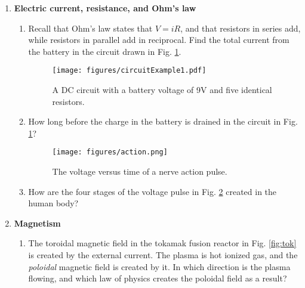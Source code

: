 \documentclass[10pt]{article}
\begin{document}
\begin{enumerate}
\begin{enumerate}
\item The capacitance of a parallel plate capacitor is $C = \epsilon_0 A/d$, where $A$ is the area of the plates, $d$ is the separation between the plates, and $\epsilon_0 = 8.85 \times 10^{-12}$ N$^{-1}$ C$^2$ m$^{-2}$.  What is the capacitance of a capacitor with an area of 4 mm$^2$ and a separation of 1 mm? \\ \vspace{2cm}
\item If two such capacitors are connected \textit{in parallel}, what is the total capacitance?  What is the total capacitance if they are connected \textit{in series}? \\ \vspace{2cm}
\end{enumerate}
\item \textbf{Electric current, resistance, and Ohm's law}
\begin{enumerate}
\item Recall that Ohm's law states that $V = iR$, and that resistors in series add, while resistors in parallel add in reciprocal.  Find the total current from the battery in the circuit drawn in Fig. \ref{fig:circuit}.
\begin{figure}[hb]
\centering
\texttt{[image: figures/circuitExample1.pdf]}
\caption{\label{fig:circuit} A DC circuit with a battery voltage of 9V and five identical resistors.}
\end{figure}
\item How long before the charge in the battery is drained in the circuit in Fig. \ref{fig:circuit}?
\begin{figure}
\centering
\texttt{[image: figures/action.png]}
\caption{\label{fig:action} The voltage versus time of a nerve action pulse.}
\end{figure}
\item How are the four stages of the voltage pulse in Fig. \ref{fig:action} created in the human body? \\ \vspace{4cm}
\end{enumerate}
\item \textbf{Magnetism}
\begin{enumerate}
\item The toroidal magnetic field in the tokamak fusion reactor in Fig. \ref{fig:tok} is created by the external current.  The plasma is hot ionized gas, and the \textit{poloidal} magnetic field is created by it.  In which direction is the plasma flowing, and which law of physics creates the poloidal field as a result?

\end{enumerate}
\end{enumerate}
\end{document}

